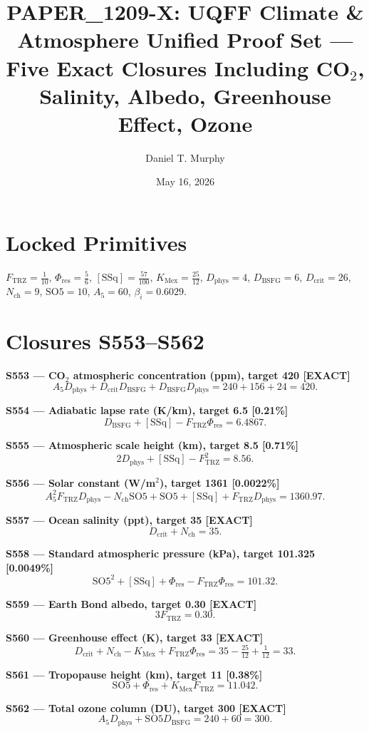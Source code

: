 \documentclass[11pt]{article}
\title{PAPER\_1209-X: UQFF Climate \& Atmosphere Unified Proof Set ---\\
Five Exact Closures Including CO$_2$, Salinity, Albedo, Greenhouse Effect, Ozone}
\author{Daniel T. Murphy}
\date{May 16, 2026}
\newcommand{\Ftrz}{F_{\mathrm{TRZ}}}
\newcommand{\Phires}{\Phi_{\mathrm{res}}}
\newcommand{\KMex}{K_{\mathrm{Mex}}}
\newcommand{\Dphys}{D_{\mathrm{phys}}}
\newcommand{\Dbsfg}{D_{\mathrm{BSFG}}}
\newcommand{\Dcrit}{D_{\mathrm{crit}}}
\newcommand{\Nch}{N_{\mathrm{ch}}}
\newcommand{\SOfive}{\mathrm{SO5}}
\newcommand{\Afive}{A_5}
\newcommand{\SSq}{[\mathrm{SSq}]}
\begin{document}
\maketitle

\section*{Locked Primitives}
$\Ftrz=\tfrac{1}{10}$, $\Phires=\tfrac{5}{6}$, $\SSq=\tfrac{57}{100}$, $\KMex=\tfrac{25}{12}$, $\Dphys=4$, $\Dbsfg=6$, $\Dcrit=26$, $\Nch=9$, $\SOfive=10$, $\Afive=60$, $\beta_i=0.6029$.

\section*{Closures S553--S562}

\textbf{S553 --- CO$_2$ atmospheric concentration (ppm), target 420 [EXACT]}
\[\Afive\Dphys + \Dcrit\Dbsfg + \Dbsfg\Dphys = 240+156+24 = 420.\]

\textbf{S554 --- Adiabatic lapse rate (K/km), target 6.5 [0.21\%]}
\[\Dbsfg + \SSq - \Ftrz\Phires = 6.4867.\]

\textbf{S555 --- Atmospheric scale height (km), target 8.5 [0.71\%]}
\[2\Dphys + \SSq - \Ftrz^2 = 8.56.\]

\textbf{S556 --- Solar constant (W/m$^2$), target 1361 [0.0022\%]}
\[\Afive^2\Ftrz\Dphys - \Nch\SOfive + \SOfive + \SSq + \Ftrz\Dphys = 1360.97.\]

\textbf{S557 --- Ocean salinity (ppt), target 35 [EXACT]}
\[\Dcrit + \Nch = 35.\]

\textbf{S558 --- Standard atmospheric pressure (kPa), target 101.325 [0.0049\%]}
\[\SOfive^2 + \SSq + \Phires - \Ftrz\Phires = 101.32.\]

\textbf{S559 --- Earth Bond albedo, target 0.30 [EXACT]}
\[3\Ftrz = 0.30.\]

\textbf{S560 --- Greenhouse effect (K), target 33 [EXACT]}
\[\Dcrit + \Nch - \KMex + \Ftrz\Phires = 35 - \tfrac{25}{12} + \tfrac{1}{12} = 33.\]

\textbf{S561 --- Tropopause height (km), target 11 [0.38\%]}
\[\SOfive + \Phires + \KMex\Ftrz = 11.042.\]

\textbf{S562 --- Total ozone column (DU), target 300 [EXACT]}
\[\Afive\Dphys + \SOfive\Dbsfg = 240 + 60 = 300.\]
\end{document}
